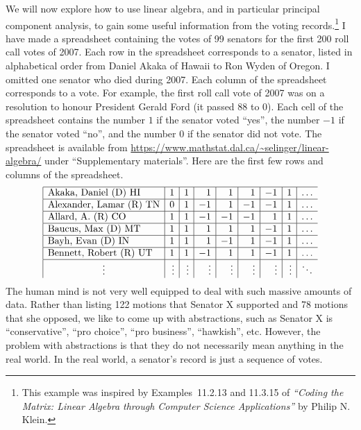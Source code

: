 \documentclass{ximera}
\begin{document}
We will now explore how to use linear algebra, and in particular
principal component analysis, to gain some useful information from the
voting records.\footnote{This example was inspired by Examples~11.2.13
  and 11.3.15 of {\em ``Coding the Matrix: Linear Algebra through
    Computer Science Applications''} by Philip N. Klein.} I have made
a spreadsheet containing the votes of 99 senators for the first 200
roll call votes of 2007. Each row in the spreadsheet corresponds to a
senator, listed in alphabetical order from Daniel Akaka of Hawaii to
Ron Wyden of Oregon. I omitted one senator who died during 2007. Each
column of the spreadsheet corresponds to a vote. For example, the
first roll call vote of 2007 was on a resolution to honour President
Gerald Ford (it passed 88 to 0). Each cell of the spreadsheet contains
the number $1$ if the senator voted ``yes'', the number $-1$ if the
senator voted ``no'', and the number $0$ if the senator did not
vote. The spreadsheet is available from
\url{https://www.mathstat.dal.ca/~selinger/linear-algebra/} under
``Supplementary materials''. Here are the first few rows and columns
of the spreadsheet.
\begin{equation*}
  \begin{array}{|l|r|r|r|r|r|r|r|r}
    \hline
    \mbox{Akaka, Daniel (D) HI} & 1 & 1 & 1 & 1 & 1 & -1 & 1 & \ldots \\\hline
    \mbox{Alexander, Lamar (R) TN} & 0 & 1 & -1 & 1 & -1 & -1 & 1 & \ldots \\\hline
    \mbox{Allard, A. (R) CO} & 1 & 1 & -1 & -1 & -1 & 1 & 1 & \ldots \\\hline
    \mbox{Baucus, Max (D) MT} & 1 & 1 & 1 & 1 & 1 & -1 & 1 & \ldots \\\hline
    \mbox{Bayh, Evan (D) IN} & 1 & 1 & 1 & -1 & 1 & -1 & 1 & \ldots \\\hline
    \mbox{Bennett, Robert (R) UT} & 1 & 1 & -1 & 1 & 1 & -1 & 1 & \ldots \\\hline
    \multicolumn{1}{|c|}{\vdots} & \vdots & \vdots & \vdots & \vdots & \vdots & \vdots & \vdots & \ddots
  \end{array}
\end{equation*}
The human mind is not very well equipped to deal with such massive
amounts of data. Rather than listing 122 motions that Senator X
supported and 78 motions that she opposed, we like to come up with
abstractions, such as Senator X is ``conservative'', ``pro choice'',
``pro business'', ``hawkish'', etc. However, the problem with
abstractions is that they do not necessarily mean anything in the real
world. In the real world, a senator's record is just a sequence of
votes.
\end{document}
